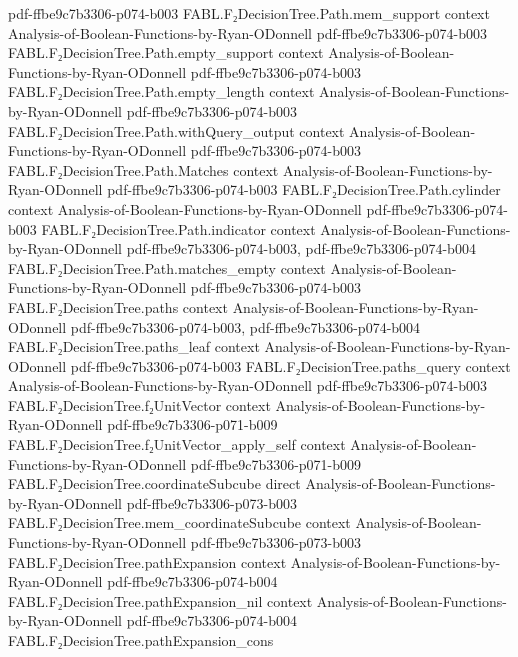 \begin{theorem}
  {pdf-ffbe9c7b3306-p074-b003}
\proofstep
  {FABL.F₂DecisionTree.Path.mem_support}
  {context}
  {Analysis-of-Boolean-Functions-by-Ryan-ODonnell}
  {pdf-ffbe9c7b3306-p074-b003}
\proofstep
  {FABL.F₂DecisionTree.Path.empty_support}
  {context}
  {Analysis-of-Boolean-Functions-by-Ryan-ODonnell}
  {pdf-ffbe9c7b3306-p074-b003}
\proofstep
  {FABL.F₂DecisionTree.Path.empty_length}
  {context}
  {Analysis-of-Boolean-Functions-by-Ryan-ODonnell}
  {pdf-ffbe9c7b3306-p074-b003}
\proofstep
  {FABL.F₂DecisionTree.Path.withQuery_output}
  {context}
  {Analysis-of-Boolean-Functions-by-Ryan-ODonnell}
  {pdf-ffbe9c7b3306-p074-b003}
\proofstep
  {FABL.F₂DecisionTree.Path.Matches}
  {context}
  {Analysis-of-Boolean-Functions-by-Ryan-ODonnell}
  {pdf-ffbe9c7b3306-p074-b003}
\proofstep
  {FABL.F₂DecisionTree.Path.cylinder}
  {context}
  {Analysis-of-Boolean-Functions-by-Ryan-ODonnell}
  {pdf-ffbe9c7b3306-p074-b003}
\proofstep
  {FABL.F₂DecisionTree.Path.indicator}
  {context}
  {Analysis-of-Boolean-Functions-by-Ryan-ODonnell}
  {pdf-ffbe9c7b3306-p074-b003,
    pdf-ffbe9c7b3306-p074-b004}
\proofstep
  {FABL.F₂DecisionTree.Path.matches_empty}
  {context}
  {Analysis-of-Boolean-Functions-by-Ryan-ODonnell}
  {pdf-ffbe9c7b3306-p074-b003}
\proofstep
  {FABL.F₂DecisionTree.paths}
  {context}
  {Analysis-of-Boolean-Functions-by-Ryan-ODonnell}
  {pdf-ffbe9c7b3306-p074-b003,
    pdf-ffbe9c7b3306-p074-b004}
\proofstep
  {FABL.F₂DecisionTree.paths_leaf}
  {context}
  {Analysis-of-Boolean-Functions-by-Ryan-ODonnell}
  {pdf-ffbe9c7b3306-p074-b003}
\proofstep
  {FABL.F₂DecisionTree.paths_query}
  {context}
  {Analysis-of-Boolean-Functions-by-Ryan-ODonnell}
  {pdf-ffbe9c7b3306-p074-b003}
\proofstep
  {FABL.F₂DecisionTree.f₂UnitVector}
  {context}
  {Analysis-of-Boolean-Functions-by-Ryan-ODonnell}
  {pdf-ffbe9c7b3306-p071-b009}
\proofstep
  {FABL.F₂DecisionTree.f₂UnitVector_apply_self}
  {context}
  {Analysis-of-Boolean-Functions-by-Ryan-ODonnell}
  {pdf-ffbe9c7b3306-p071-b009}
\proofstep
  {FABL.F₂DecisionTree.coordinateSubcube}
  {direct}
  {Analysis-of-Boolean-Functions-by-Ryan-ODonnell}
  {pdf-ffbe9c7b3306-p073-b003}
\proofstep
  {FABL.F₂DecisionTree.mem_coordinateSubcube}
  {context}
  {Analysis-of-Boolean-Functions-by-Ryan-ODonnell}
  {pdf-ffbe9c7b3306-p073-b003}
\proofstep
  {FABL.F₂DecisionTree.pathExpansion}
  {context}
  {Analysis-of-Boolean-Functions-by-Ryan-ODonnell}
  {pdf-ffbe9c7b3306-p074-b004}
\proofstep
  {FABL.F₂DecisionTree.pathExpansion_nil}
  {context}
  {Analysis-of-Boolean-Functions-by-Ryan-ODonnell}
  {pdf-ffbe9c7b3306-p074-b004}
\proofstep
  {FABL.F₂DecisionTree.pathExpansion_cons}

\end{theorem}

